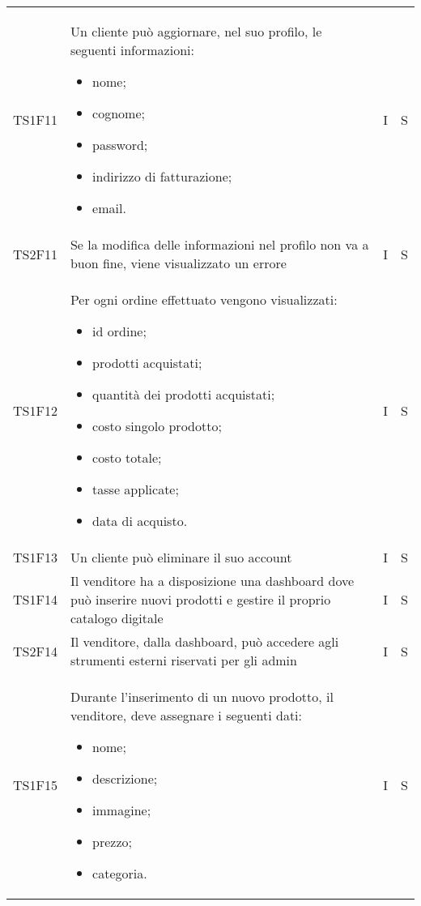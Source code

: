 {\begin{longtable}{C{2cm} C{9.6cm} C{1.5cm} C{1cm}}
TS1F11 & Un cliente può aggiornare, nel suo profilo, le seguenti informazioni:
\begin{itemize}
	\item nome;
	\item cognome;
	\item password;
	\item indirizzo di fatturazione;
	\item email.
\end{itemize}
& I & S\\

TS2F11 & Se la modifica delle informazioni nel profilo non va a buon fine, viene visualizzato un errore & I & S\\

TS1F12 & Per ogni ordine effettuato vengono visualizzati:
\begin{itemize}
	\item id ordine;
	\item prodotti acquistati;
	\item quantità dei prodotti acquistati;
	\item costo singolo prodotto;
	\item costo totale;
	\item tasse applicate;
	\item data di acquisto.
\end{itemize}
& I & S\\

TS1F13 & Un cliente può eliminare il suo account & I & S\\

TS1F14 & Il venditore ha a disposizione una dashboard dove può inserire nuovi prodotti e gestire il proprio catalogo digitale & I & S\\

TS2F14 & Il venditore, dalla dashboard, può accedere agli strumenti esterni riservati per gli admin & I & S\\

TS1F15 & Durante l'inserimento di un nuovo prodotto, il venditore, deve assegnare i seguenti dati:
\begin{itemize}
	\item nome;
	\item descrizione;
	\item immagine;
	\item prezzo;
	\item categoria.
\end{itemize} & I & S\\


\end{longtable}}
